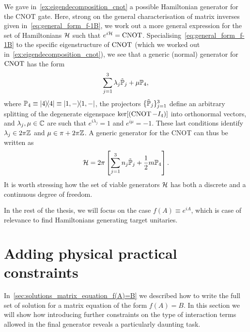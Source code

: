 \begin{example}[label={ex:cnot_generator_decomposition}]
We gave in~\cref{ex:eigendecomposition_cnot} a possible Hamiltonian generator for the CNOT gate.
Here, strong on the general characterisation of matrix inverses given in~\cref{eq:general_form_f-1B}, we work out a more general expression for the set of Hamiltonians $\mathcal{H}$ such that $e^{i\mathcal{H}}=\operatorname{CNOT}$.
Specialising~\cref{eq:general_form_f-1B} to the specific eigenstructure of $\operatorname{CNOT}$ (which we worked out in~\cref{ex:eigendecomposition_cnot}), we see that a generic (normal) generator for $\operatorname{CNOT}$ has the form
\begin{equation}
    \sum_{j=1}^3 \lambda_j \tilde{\mathbb{P}}_j + \mu\mathbb{P}_4,
\end{equation}
where
$\mathbb{P}_4\equiv\ketbra 4\equiv\ketbra{1,-}$, the projectors 
$\{\tilde{\mathbb{P}}_j\}_{j=1}^3$ define an arbitrary splitting of the degenerate eigenspace $\ker[(\operatorname{CNOT}-I_4)]$ into orthonormal vectors, and $\lambda_j,\mu\in\mathbb{C}$ are such that $e^{i\lambda_j}=1$ and $e^{i\mu}=-1$.
These last conditions identify $\lambda_j\in2\pi\mathbb{Z}$ and $\mu\in\pi + 2\pi\mathbb{Z}$.
A generic generator for the CNOT can thus be written as
\begin{equation}
    \mathcal{H} =
    2\pi\left[
    \sum_{j=1}^3 n_j \tilde{\mathbb{P}}_j +
    \frac{1}{2} m\mathbb{P}_4
    \right].
\end{equation}
It is worth stressing how the set of viable generators $\mathcal{H}$ has both a discrete and a continuous degree of freedom.
\end{example}

In the rest of the thesis, we will focus on the case $f(A)\equiv e^{iA}$, which is case of relevance to find Hamiltonians generating target unitaries.

\section{Adding physical practical constraints}
\label{sec:constraints_on_interaction_pars}

In~\cref{sec:solutions_matrix_equation_f(A)=B} we described how to write the full set of solution for a matrix equation of the form $f(A)=B$.
In this section we will show how introducing further constraints on the type of interaction terms allowed in the final generator reveals a particularly daunting task.

